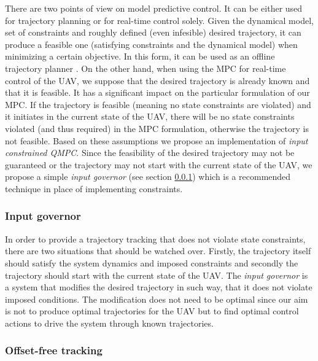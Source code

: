 There are two points of view on model predictive control. It can be either used for trajectory planning or for real-time control solely. Given the dynamical model, set of constraints and roughly defined (even infesible) desired trajectory, it can produce a feasible one (satisfying constraints and the dynamical model) when minimizing a certain objective. In this form, it can be used as an offline trajectory planner \citep{saska2014formations}. On the other hand, when using the MPC for real-time control of the UAV, we suppose that the desired trajectory is already known and that it is feasible. It has a significant impact on the particular formulation of our MPC. If the trajectory is feasible (meaning no state constraints are violated) and it initiates in the current state of the UAV, there will be no state constraints violated (and thus required) in the MPC formulation, otherwise the trajectory is not feasible. Based on these assumptions we propose an implementation of \emph{input constrained QMPC}. Since the feasibility of the desired trajectory may not be guaranteed or the trajectory may not start with the current state of the UAV, we propose a simple \emph{input governor} (see section \ref{cap:input_governor}) which is a recommended technique \citep{rossiter2013mpcpracticalapproach} in place of implementing constraints.

\subsubsection{Input governor}
\label{cap:input_governor}

In order to provide a trajectory tracking that does not violate state constraints, there are two situations that should be watched over. Firstly, the trajectory itself should satisfy the system dynamics and imposed constraints and secondly the trajectory should start with the current state of the UAV. The \emph{input governor} is a system that modifies the desired trajectory in such way, that it does not violate imposed conditions. The modification does not need to be optimal since our aim is not to produce optimal trajectories for the UAV but to find optimal control actions to drive the system through known trajectories.

\subsubsection{Offset-free tracking}
\label{cap:offset_free_tracking}

